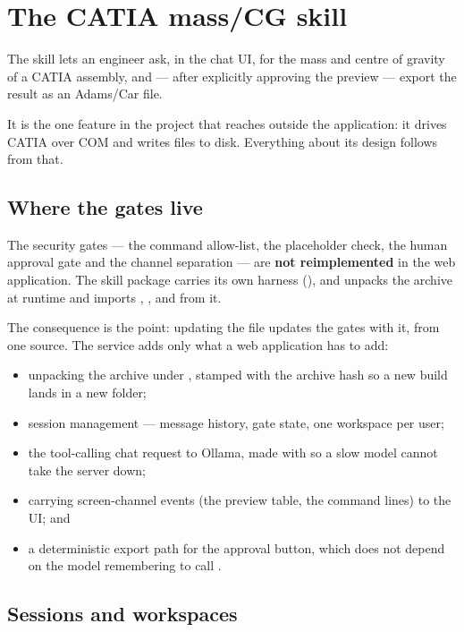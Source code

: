 \chapter{The CATIA mass/CG skill}
\label{ch:catia}

The skill lets an engineer ask, in the chat UI, for the mass and centre of
gravity of a CATIA assembly, and --- after explicitly approving the preview ---
export the result as an Adams/Car  file.

It is the one feature in the project that reaches outside the application: it
drives CATIA over COM and writes files to disk. Everything about its design
follows from that.

\section{Where the gates live}

The security gates --- the command allow-list, the placeholder check, the human
approval gate and the channel separation --- are \textbf{not reimplemented} in
the web application. The skill package  carries
its own harness (), and  unpacks
the archive at runtime and imports , ,
 and  from it.

The consequence is the point: updating the  file updates the gates
with it, from one source. The service adds only what a web application has to
add:

\begin{itemize}
\item unpacking the archive under , stamped with the
archive hash so a new build lands in a new folder;
\item session management --- message history, gate state, one workspace per
user;
\item the tool-calling chat request to Ollama, made with  so a slow
model cannot take the server down;
\item carrying screen-channel events (the preview table, the command lines) to
the UI; and
\item a deterministic export path for the approval button, which does not depend
on the model remembering to call .
\end{itemize}

\section{Sessions and workspaces}

